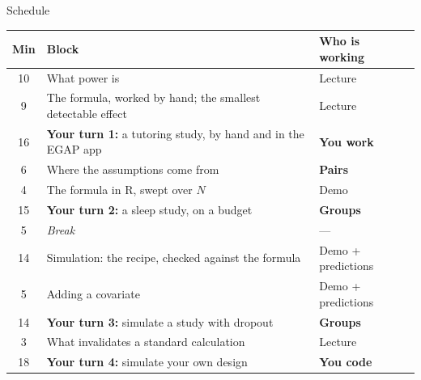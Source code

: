 \documentclass[
  ignorenonframetext,
  aspectratio=169,
]{beamer}
\begin{document}
\begin{frame}{Schedule}
\label{schedule}
\vspace{0.3em}

\begin{center}
\footnotesize
\setlength{\tabcolsep}{7pt}
\renewcommand{\arraystretch}{1.05}
\begin{tabular}{c>{\raggedright\arraybackslash}p{7.8cm}>{\raggedright\arraybackslash}p{3.1cm}}
\toprule
\textbf{Min} & \textbf{Block} & \textbf{Who is working} \\
\midrule
10 & What power is                                              & Lecture \\
9  & The formula, worked by hand; the smallest detectable effect & Lecture \\
16 & \textcolor{statsecondary}{\textbf{Your turn 1:}} a tutoring study, by hand and in the EGAP app & \textbf{You work} \\
6  & Where the assumptions come from                            & \textbf{Pairs} \\
4  & The formula in R, swept over $N$                           & Demo \\
15 & \textcolor{statsecondary}{\textbf{Your turn 2:}} a sleep study, on a budget & \textbf{Groups} \\
\midrule
5  & \textit{Break}                                             & --- \\
\midrule
14 & Simulation: the recipe, checked against the formula        & Demo + predictions \\
5  & Adding a covariate                                         & Demo + predictions \\
14 & \textcolor{statsecondary}{\textbf{Your turn 3:}} simulate a study with dropout & \textbf{Groups} \\
3  & What invalidates a standard calculation                    & Lecture \\
18 & \textcolor{statsecondary}{\textbf{Your turn 4:}} simulate your own design & \textbf{You code} \\
\bottomrule
\end{tabular}
\end{center}
\end{frame}
\end{document}
